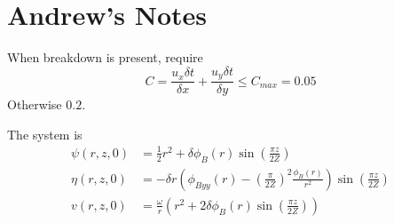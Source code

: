 \documentclass{X:/Documents/Coding/Latex/myreport}
\begin{document}







\clearpage

\section{Andrew's Notes}


When breakdown is present, require
\[C = \frac{u_x \delta t}{\delta x} + \frac{u_y \delta t}{\delta y} \leq C_{max} = 0.05\]
Otherwise $0.2$.


The system is
\begin{align*}
    \psi(r,z,0) &= \frac12 r^2 + \delta \phi_B(r) \sin\left(\frac{\pi z}{2Z}\right)\\
    \eta(r,z,0) &= - \delta r \left(\phi_{Byy}(r) - \left(\frac{\pi}{2Z}\right)^2 \frac{\phi_B(r)}{r^2}\right)  \sin\left(\frac{\pi z}{2Z}\right)\\
    v(r,z,0) &= \frac{\omega}{r} \left(r^2  +2\delta \phi_B(r) \sin\left(\frac{\pi z}{2Z}\right)\right)
\end{align*}
\end{document}

